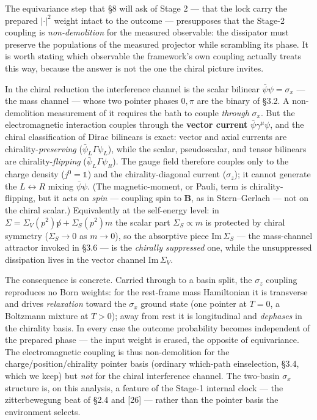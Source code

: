 \documentclass[
]{article}
\begin{document}
The equivariance step that §8 will ask of Stage 2 --- that the lock
carry the prepared \(|\cdot|^2\) weight intact to the outcome ---
presupposes that the Stage-2 coupling is \emph{non-demolition} for the
measured observable: the dissipator must preserve the populations of the
measured projector while scrambling its phase. It is worth stating which
observable the framework's own coupling actually treats this way,
because the answer is not the one the chiral picture invites.

In the chiral reduction the interference channel is the scalar bilinear
\(\bar\psi\psi=\sigma_x\) --- the mass channel --- whose two pointer
phases \(0,\pi\) are the binary of §3.2. A non-demolition measurement of
it requires the bath to couple \emph{through} \(\sigma_x\). But the
electromagnetic interaction couples through the \textbf{vector current}
\(\bar\psi\gamma^\mu\psi\), and the chiral classification of Dirac
bilinears is exact: vector and axial currents are
chirality-\emph{preserving} (\(\bar\psi_L\Gamma\psi_L\)), while the
scalar, pseudoscalar, and tensor bilinears are chirality-\emph{flipping}
(\(\bar\psi_L\Gamma\psi_R\)). The gauge field therefore couples only to
the charge density (\(j^0=\mathbb{1}\)) and the chirality-diagonal
current (\(\sigma_z\)); it cannot generate the \(L\leftrightarrow R\)
mixing \(\bar\psi\psi\). (The magnetic-moment, or Pauli, term is
chirality-flipping, but it acts on \emph{spin} --- coupling spin to
\(\mathbf B\), as in Stern--Gerlach --- not on the chiral scalar.)
Equivalently at the self-energy level: in
\(\Sigma=\Sigma_V(p^2)\not p+\Sigma_S(p^2)m\) the scalar part
\(\Sigma_S\propto m\) is protected by chiral symmetry (\(\Sigma_S\to0\)
as \(m\to0\)), so the absorptive piece \(\mathrm{Im}\,\Sigma_S\) --- the
mass-channel attractor invoked in §3.6 --- is the \emph{chirally
suppressed} one, while the unsuppressed dissipation lives in the vector
channel \(\mathrm{Im}\,\Sigma_V\).

The consequence is concrete. Carried through to a basin split, the
\(\sigma_z\) coupling reproduces no Born weights: for the rest-frame
mass Hamiltonian it is transverse and drives \emph{relaxation} toward
the \(\sigma_x\) ground state (one pointer at \(T=0\), a Boltzmann
mixture at \(T>0\)); away from rest it is longitudinal and
\emph{dephases} in the chirality basis. In every case the outcome
probability becomes independent of the prepared phase --- the input
weight is erased, the opposite of equivariance. The electromagnetic
coupling is thus non-demolition for the charge/position/chirality
pointer basis (ordinary which-path einselection, §3.4, which we keep)
but \emph{not} for the chiral interference channel. The two-basin
\(\sigma_x\) structure is, on this analysis, a feature of the Stage-1
internal clock --- the zitterbewegung beat of §2.4 and {[}26{]} ---
rather than the pointer basis the environment selects.
\end{document}
